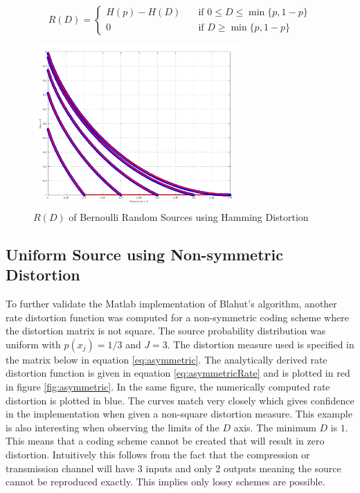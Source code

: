 \documentclass[journal]{IEEEtran}
\begin{document}
\begin{equation}
\label{eq:binaryAnalytical}
R(D) = 
  \begin{cases}
    H(p) - H(D) & \quad \text{if } 0\leq D\leq \min\{{p,1-p}\} \\
    0 & \quad \text{if } D \geq \min\{{p,1-p}\}
  \end{cases}
\end{equation}

\begin{figure}[!h]
\centering
\includegraphics[width=3.1in]{../images/bernoulli.png}
\caption{\(R(D)\) of Bernoulli Random Sources using Hamming Distortion}
\label{fig:binaryAnalytical}
\end{figure}

\subsection{Uniform Source using Non-symmetric Distortion}
\par To further validate the Matlab implementation of Blahut's algorithm, another rate distortion function was computed for a non-symmetric coding scheme where the distortion matrix is not square. The source probability distribution was uniform with \(p(x_j) = 1/3\) and \(J=3\). The distortion measure used is specified in the matrix below in equation \ref{eq:asymmetric}. The analytically derived rate distortion function is given in equation \ref{eq:asymmetricRate} and is plotted in red in figure \ref{fig:asymmetric}. In the same figure, the numerically computed rate distortion is plotted in blue. The curves match very closely which gives confidence in the implementation when given a non-square distortion measure. This example is also interesting when observing the limits of the \(D\) axis. The minimum \(D\) is \(1\). This means that a coding scheme cannot be created that will result in zero distortion. Intuitively this follows from the fact that the compression or transmission channel will have \(3\) inputs and only \(2\) outputs meaning the source cannot be reproduced exactly. This implies only lossy schemes are possible.
\end{document}
